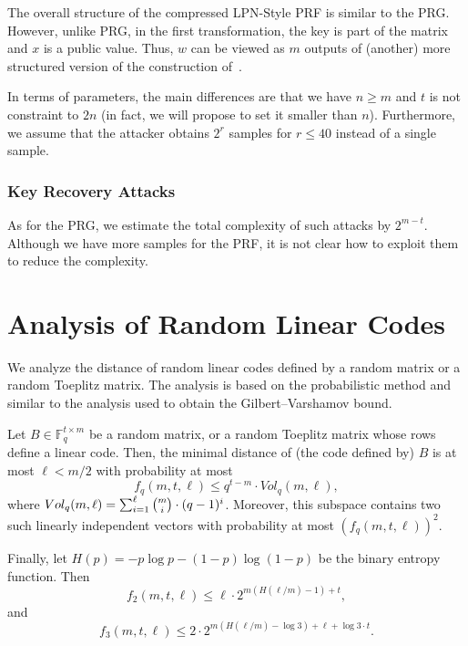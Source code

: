 \documentclass[orivec,envcountsect]{llncs}
\begin{document}
The overall structure of the compressed LPN-Style PRF is similar to the PRG.
However, unlike PRG, in the first transformation, the key is part of the matrix and
$x$ is a public value. 
Thus, $w$ can be viewed as $m$ outputs of (another) more 
structured version of the construction of~\cite{BonehIPSW18}.

In terms of parameters, the main differences are that we have $n \geq m$ 
and $t$ is not constraint to $2n$ (in fact, we will propose to set it smaller than $n$).
Furthermore, we assume that the attacker obtains $2^r$ samples for $r \leq 40$ instead of a single sample. 

\subsubsection{Key Recovery Attacks}

As for the PRG, we estimate the total complexity of such attacks by $2^{m - t}$.
Although we have more samples for the PRF, it is not clear how to exploit them to reduce the complexity.






\appendix

\section{Analysis of Random Linear Codes}
\label{app:distance}

We analyze the distance of random linear codes defined by a random matrix 
or a random Toeplitz matrix.
The analysis is based on the probabilistic method and 
similar to the analysis used to obtain the Gilbert–Varshamov bound.

\begin{proposition}
\label{prop:hw}
Let $B \in \mathbb{F}^{t \times m}_{q}$ be a random matrix, or a random Toeplitz matrix whose rows define
a linear code.
Then, the minimal distance of (the code defined by) $B$ is at most $\ell < m/2$ with probability at most
$$f_q(m,t,\ell) \leq q^{t-m} \cdot Vol_q(m,\ell),$$
where $Vol_q(m,\ell) = \sum_{i=1}^\ell \tbinom{m}{i} \cdot (q-1)^{i}$.
Moreover, this subspace contains two such linearly independent vectors with probability at most $(f_q(m,t,\ell))^2$.

Finally, let $H(p) = - p \log p - (1-p) \log(1-p)$ be the binary entropy function.
Then
$$f_2(m,t,\ell) \leq \ell \cdot 2^{m (H(\ell/m) - 1) + t},$$
and
$$f_3(m,t,\ell) \leq 2 \cdot 2^{m (H(\ell/m) - \log 3) + \ell + \log 3 \cdot t}.$$
\end{proposition}
\end{document}
